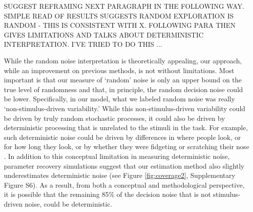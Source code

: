 \documentclass[12pt]{article}
\begin{document}

SUGGEST REFRAMING NEXT PARAGRAPH IN THE FOLLOWING WAY.  SIMPLE READ OF RESULTS SUGGESTS RANDOM EXPLORATION IS RANDOM - THIS IS CONSISTENT WITH X.  FOLLOWING PARA THEN GIVES LIMITATIONS AND TALKS ABOUT DETERMINISTIC INTERPRETATION.  I'VE TRIED TO DO THIS ...

 


    While the random noise interpretation is theoretically appealing, our approach, while an improvement on previous methods, is not without limitations. Most important is that our measure of `random' noise is only an upper bound on the true level of randomness and that, in principle, the random decision noise could be lower. Specifically, in our model, what we labeled random noise was really `non-stimulus-driven variability.' While this non-stimulus-driven variability could be driven by truly random stochastic processes, it could also be driven by deterministic processing that is unrelated to the stimuli in the task. For example, such deterministic noise could be driven by differences in where people look, or for how long they look, or by whether they were fidgeting or scratching their nose \citep{Musall2019}. In addition to this conceptual limitation in measuring deterministic noise, parameter recovery simulations suggest that our estimation method also slightly underestimates deterministic noise (see Figure \ref{fig:coverage2}, Supplementary Figure S6). As a result, from both a conceptual and methodological perspective, it is possible that the remaining 85\% of the decision noise that is not stimulus-driven noise, could be deterministic.
\end{document}
